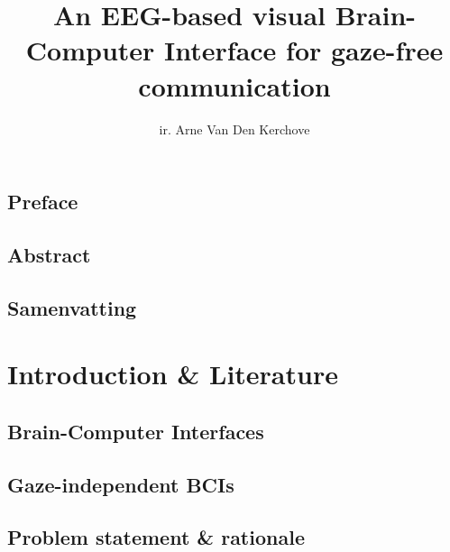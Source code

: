 %
\usepackage{todonotes}
\usepackage{lipsum}
\usepackage{hyperref}
\usepackage{tabularx}
\usepackage{booktabs}
\usepackage[inline]{enumitem}
\usepackage{subcaption}


\newcommand{\includechapter}[2]{
  \chapter{#1}
  \begin{refsection}
  
    \printbibliography[heading=subbibliography]
  \end{refsection}
  \clearpage
}

\usepackage[backend=biber]{biblatex}



\title{\sffamily An EEG-based visual Brain-Computer Interface for gaze-free communication}
\author{ir. Arne Van Den Kerchove}




\pagestyle{front}
\frontmatter

\chapter{Preface}
\lipsum[1]
\chapter{Abstract}
\lipsum[2-4]
\chapter{Samenvatting}
\lipsum[5-7]
\tableofcontents
\listoffigures
\listoftables



\mainmatter%
\pagestyle{main}


\part{Introduction \& Literature}
\includechapter{Brain-Computer Interfaces}{chapters/bci.tex}
\includechapter{Gaze-independent BCIs}{chapters/gaze_independence.tex}
\includechapter{Problem statement \& rationale}{chapters/problem_statement.tex}
